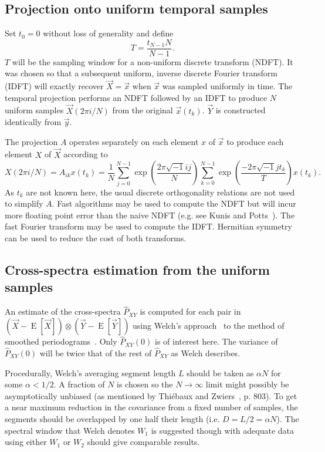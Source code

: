 \documentclass[letterpaper,11pt,nointlimits,reqno]{amsart}
\begin{document}
\subsection*{Projection onto uniform temporal samples}

Set $t_0=0$ without loss of generality and define
$$
T = \frac{t_{N-1} N}{N-1}.
$$
$T$ will be the sampling window for a non-uniform discrete transform (NDFT).
It was chosen so that a subsequent uniform, inverse discrete Fourier transform
(IDFT) will exactly recover $\vec{X}=\vec{x}$ when $\vec{x}$ was sampled
uniformly in time.  The temporal projection performs an NDFT followed by an
IDFT to produce $N$ uniform samples $\vec{X}\left(2\pi{}i/N\right)$ from the
original $\vec{x}\left(t_k\right)$.  $\vec{Y}$ is constructed identically from
$\vec{y}$.

The projection $A$ operates separately on each element $x$ of $\vec{x}$
to produce each element $X$ of $\vec{X}$ according to
$$
    X\left(2\pi{}i/N\right)
    =
    A_{ik} x\left(t_k\right)
    =
    \frac{1}{N}
    \sum_{j=0}^{N-1} \exp\left(\frac{ 2\pi\sqrt{-1} i j   }{N} \right)
    \sum_{k=0}^{N-1} \exp\left(\frac{-2\pi\sqrt{-1} j t_k }{T} \right)
    x\left(t_k\right)
.
$$
As $t_k$ are not known here, the usual discrete orthogonality relations are not
used to simplify $A$.  Fast algorithms may be used to compute the NDFT but will
incur more floating point error than the naive NDFT (e.g. see Kunis and
Potts~\cite{Kunis2008Time}).  The fast Fourier transform may be used to compute
the IDFT.  Hermitian symmetry can be used to reduce the cost of both
transforms.

\subsection*{Cross-spectra estimation from the uniform samples}

An estimate of the cross-spectra $\hat{P}_{XY}$ is computed for each pair in
$\left(\vec{X} - \operatorname{E}\left[\vec{X}\right]\right) \otimes
\left(\vec{Y} - \operatorname{E}\left[\vec{Y}\right]\right)$ using Welch's
approach~\cite{Welch1967Use} to the method of smoothed
periodograms~\cite{Bartlett1948Smoothing}.  Only $\hat{P}_{XY}(0)$ is of
interest here.  The variance of $\hat{P}_{XY}(0)$ will be twice that of the
rest of $\hat{P}_{XY}$ as Welch describes.

Procedurally, Welch's averaging segment length $L$ should be taken as
$\alpha{}N$ for some $\alpha<1/2$.  A fraction of $N$ is chosen so the
$N\to\infty$ limit might possibly be asymptotically unbiased (as mentioned by
Thi\'{e}baux and Zwiers~\cite{Thiebaux1984Interpretation}, p. 803).  To get a
near maximum reduction in the covariance from a fixed number of samples, the
segments should be overlapped by one half their length (i.e.  $D = L / 2 =
\alpha{}N$).  The spectral window that Welch denotes $W_1$ is suggested though
with adequate data using either $W_1$ or $W_2$ should give comparable results.
\end{document}

